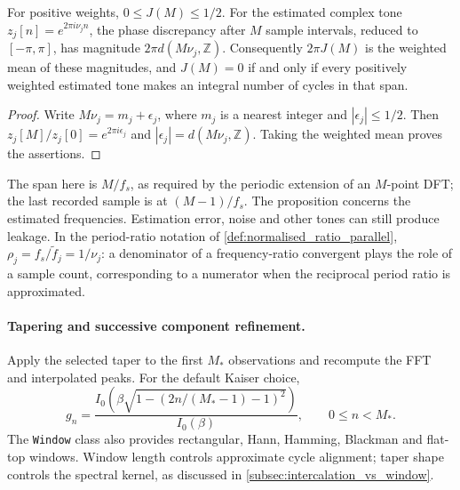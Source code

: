 \begin{proposition}\label{prop:calendar_leap_phase_cost}
For positive weights, \(0\le J(M)\le1/2\). For the estimated complex tone \(z_j[n]=e^{2\pi i\nu_j n}\), the phase discrepancy after \(M\) sample intervals, reduced to \([-\pi,\pi]\), has magnitude \(2\pi d(M\nu_j,\mathbb Z)\). Consequently \(2\pi J(M)\) is the weighted mean of these magnitudes, and \(J(M)=0\) if and only if every positively weighted estimated tone makes an integral number of cycles in that span.
\end{proposition}
\begin{proof}
Write \(M\nu_j=m_j+\epsilon_j\), where \(m_j\) is a nearest integer and \(|\epsilon_j|\le1/2\). Then \(z_j[M]/z_j[0]=e^{2\pi i\epsilon_j}\) and \(|\epsilon_j|=d(M\nu_j,\mathbb Z)\). Taking the weighted mean proves the assertions.
\end{proof}
The span here is \(M/f_s\), as required by the periodic extension of an \(M\)-point DFT; the last recorded sample is at \((M-1)/f_s\). The proposition concerns the estimated frequencies. Estimation error, noise and other tones can still produce leakage. In the period-ratio notation of \cref{def:normalised_ratio_parallel}, \(\rho_j=f_s/\widetilde f_j=1/\nu_j\): a denominator of a frequency-ratio convergent plays the role of a sample count, corresponding to a numerator when the reciprocal period ratio is approximated.

\paragraph{Tapering and successive component refinement.}
Apply the selected taper to the first \(M_*\) observations and recompute the FFT and interpolated peaks. For the default Kaiser choice,
\[
g_n=\frac{I_0\!\left(\beta\sqrt{1-(2n/(M_*-1)-1)^2}\right)}{I_0(\beta)},
\qquad 0\le n<M_*.
\]
The \texttt{Window} class also provides rectangular, Hann, Hamming, Blackman and flat-top windows. Window length controls approximate cycle alignment; taper shape controls the spectral kernel, as discussed in \cref{subsec:intercalation_vs_window}.

